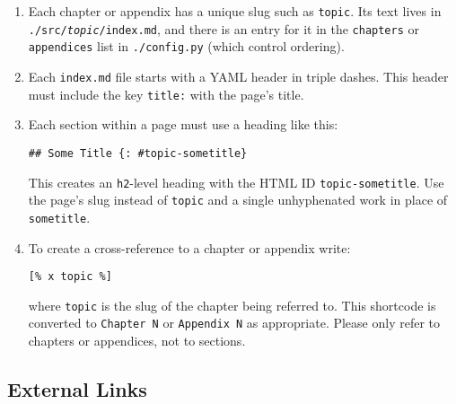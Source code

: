 \documentclass{scrbook}
\begin{document}
\begin{enumerate}

\item 

Each chapter or appendix has a unique slug such as \texttt{topic}.
    Its text lives in \texttt{./src/\emph{topic}/index.md},
    and there is an entry for it in the \texttt{chapters} or \texttt{appendices} list in \texttt{./config.py}
    (which control ordering).



\item 

Each \texttt{index.md} file starts with a YAML header in triple dashes.
    This header must include the key \texttt{title:} with the page's title.



\item 

Each section within a page must use a heading like this:

\begin{lstlisting}[frame=single,frameround=tttt]
## Some Title {: #topic-sometitle}
\end{lstlisting}


This creates an \texttt{h2}-level heading with the HTML ID \texttt{topic-sometitle}.
Use the page's slug instead of \texttt{topic} and a single unhyphenated work
in place of \texttt{sometitle}.



\item 

To create a cross-reference to a chapter or appendix write:

\begin{lstlisting}[frame=single,frameround=tttt]
[% x topic %]
\end{lstlisting}


where \texttt{topic} is the slug of the chapter being referred to.
This shortcode is converted to \texttt{Chapter N} or \texttt{Appendix N} as appropriate.
Please only refer to chapters or appendices, not to sections.



\end{enumerate}

\subsection*{External Links}
\end{document}
